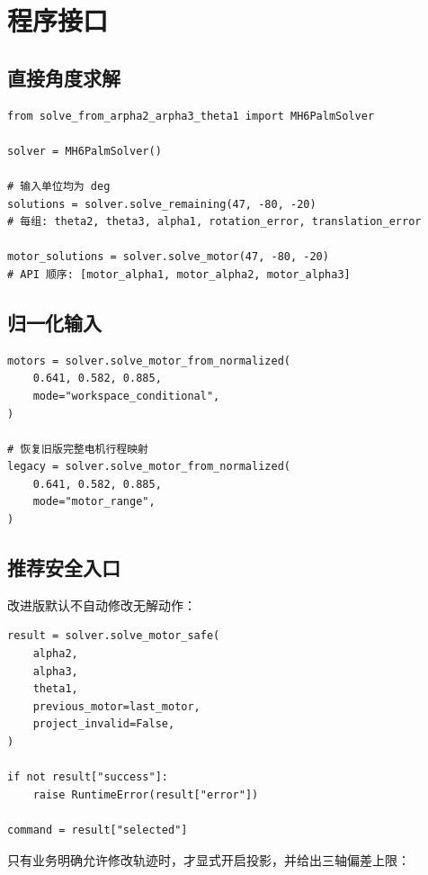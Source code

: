 \documentclass[11pt,a4paper,fontset=none]{ctexart}
\begin{document}
\section{程序接口}

\subsection{直接角度求解}

\begin{lstlisting}[style=pythonstyle]
from solve_from_arpha2_arpha3_theta1 import MH6PalmSolver

solver = MH6PalmSolver()

# 输入单位均为 deg
solutions = solver.solve_remaining(47, -80, -20)
# 每组: theta2, theta3, alpha1, rotation_error, translation_error

motor_solutions = solver.solve_motor(47, -80, -20)
# API 顺序: [motor_alpha1, motor_alpha2, motor_alpha3]
\end{lstlisting}

\subsection{归一化输入}

\begin{lstlisting}[style=pythonstyle]
motors = solver.solve_motor_from_normalized(
    0.641, 0.582, 0.885,
    mode="workspace_conditional",
)

# 恢复旧版完整电机行程映射
legacy = solver.solve_motor_from_normalized(
    0.641, 0.582, 0.885,
    mode="motor_range",
)
\end{lstlisting}

\newpage
\subsection{推荐安全入口}

改进版默认不自动修改无解动作：

\begin{lstlisting}[style=pythonstyle]
result = solver.solve_motor_safe(
    alpha2,
    alpha3,
    theta1,
    previous_motor=last_motor,
    project_invalid=False,
)

if not result["success"]:
    raise RuntimeError(result["error"])

command = result["selected"]
\end{lstlisting}

只有业务明确允许修改轨迹时，才显式开启投影，并给出三轴偏差上限：
\end{document}
